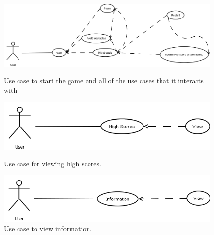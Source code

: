 \documentclass[10pt,conference,onecolumn,compsoc]{IEEEtran}
\begin{document}
\begin{figure}[h!]
\centering
\includegraphics[scale=.4]{Start.png}
\caption{Use case to start the game and all of the use cases that it interacts with.}
\label{Start}

\includegraphics[scale=.5]{HighScores.png}
\caption{Use case for viewing high scores.}
\label{Scores}

\includegraphics[scale=.5]{Information.png}
\caption{Use case to view information.}
\label{Info}
\end{figure}

\clearpage
\end{document}
